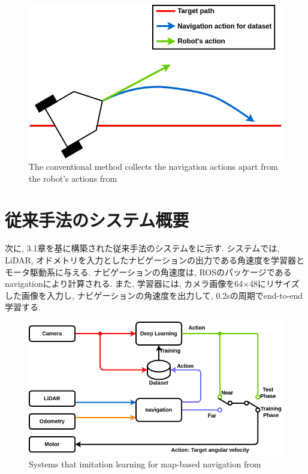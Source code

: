 \begin{figure}[h]
  \centering
  \includegraphics[keepaspectratio, scale=0.4]{images/old-method3.png}
  \caption{The conventional method collects the navigation actions apart from the robot's actions from \cite{okada-si2020}}
  \label{Fig:old-method3}
  \end{figure}

\newpage
\section{従来手法のシステム概要}
次に, 3.1章を基に構築された従来手法のシステムをに示す. システムでは, LiDAR, オドメトリを入力としたナビゲーションの出力である角速度を学習器とモータ駆動系に与える. ナビゲーションの角速度は, ROSのパッケージであるnavigation\cite{navigation}により計算される. また, 学習器には, カメラ画像を64×48にリサイズした画像を入力し, ナビゲーションの角速度を出力して, 0.2sの周期でend-to-end学習する. 

\vspace{10mm}
\begin{figure}[h]
  \centering
  \includegraphics[keepaspectratio, scale=0.45]
  {images/okada-method.png}
  \caption{Systems that imitation learning for map-based navigation from \cite{okada-si2021}}
  \label{Fig:okada-method}
  \end{figure}

